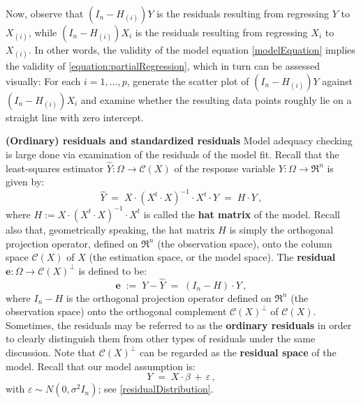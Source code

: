 \documentclass{article}
\begin{document}
Now, observe that $\left(I_{n} - H_{(i)}\right)Y$ is the residuals resulting from regressing $Y$ to $X_{(i)}$,
while $\left(I_{n} - H_{(i)}\right)X_{i}$ is the residuals resulting from regressing $X_{i}$ to $X_{(i)}$.
In other words, the validity of the model equation \eqref{modelEquation} implies the validity of \eqref{equation:partialRegression},
which in turn can be assessed visually: For each $i = 1, \ldots, p$, generate the scatter plot of $\left(I_{n} - H_{(i)}\right)Y$ against
$\left(I_{n} - H_{(i)}\right)X_{i}$ and examine whether the resulting data points roughly lie on a straight line with zero intercept.

\vskip 1.00cm
\noindent
\textbf{(Ordinary) residuals and standardized residuals} \vskip 0.1cm
Model adequacy checking is large done via examination of the residuals of the model fit.
Recall that the least-squares estimator $\widehat{Y}  : \Omega \longrightarrow \mathcal{C}(X)$
of the response variable $Y : \Omega \longrightarrow \Re^{n}$
is given by:
\begin{equation*}
\widehat{Y} \; = \; X\cdot\left(X^{t}\cdot X\right)^{-1}\cdot X^{t} \cdot Y \; = \; H \cdot Y\,,
\end{equation*}
where $H := X\cdot\left(X^{t}\cdot X\right)^{-1}\cdot X^{t}$ is called the \textbf{hat matrix}
of the model. Recall also that, geometrically speaking, the hat matrix $H$ is simply the orthogonal
projection operator, defined on $\Re^{n}$ (the observation space), onto the column space
$\mathcal{C}(X)$ of $X$ (the estimation space, or the model space).
The \textbf{residual} $\mathbf{e} : \Omega \longrightarrow \mathcal{C}(X)^{\perp}$ is defined to be:
\begin{equation*}
\mathbf{e}
\; := \; Y - \widehat{Y}
\;  = \; \left(I_{n} - H\right) \cdot Y\,,
\end{equation*}
where $I_{n} - H$ is the orthogonal projection operator defined on $\Re^{n}$ (the observation space)
onto the orthogonal complement $\mathcal{C}(X)^{\perp}$ of $\mathcal{C}(X)$.
Sometimes, the residuals may be referred to as the \textbf{ordinary residuals} in order to clearly
distinguish them from other types of residuals under the same discussion.
Note that $\mathcal{C}(X)^{\perp}$ can be regarded as the \textbf{residual space} of the model.
Recall that our model assumption is:
\begin{equation*}
Y \; = \; X\cdot\beta \, + \, \varepsilon\,,
\end{equation*}
with $\varepsilon \sim N\!\left(0,\sigma^{2}I_{n}\right)$; see \eqref{residualDistribution}.
\end{document}
